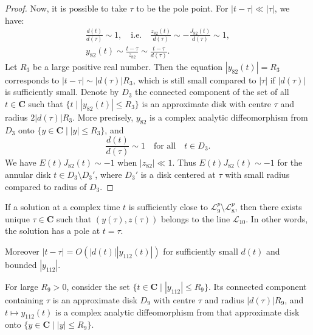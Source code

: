 \begin{proof}
 Now, it is possible to take $\tau$ to be the pole point.
 For $|t-\tau|\ll|\tau|$, we have:
 \begin{gather*}
 \frac{d(t)}{d(\tau)}\sim1,
 \quad\text{i.e.}\quad
 \frac{z_{82}(t)}{d(\tau)}\sim-\frac{J_{82}(t)}{d(\tau)}\sim1,
 \\
 y_{82}(t)\sim\frac{t-\tau}{z_{82}}\sim\frac{t-\tau}{d(\tau)}.
 \end{gather*}
 Let $R_3$ be a large positive real number.
 Then the equation $|y_{82}(t)|=R_3$ corresponds to $|t-\tau|\sim|d(\tau)|R_3$, which is still small compared to $|\tau|$ if $|d(\tau)|$ is sufficiently small.
 Denote by $D_3$ the connected component of the set of all $t\in\mathbf{C}$ such that $\{t\mid |y_{82}(t)|\le R_3\}$ is an approximate disk with centre $\tau$ and radius $2|d(\tau)|R_3$.
More precisely, $y_{82}$ is a complex analytic diffeomorphism from $D_3$ onto $\{y\in\mathbf{C}\mid|y|\le R_3\}$, and
$$
\frac{d(t)}{d(\tau)}\sim1
\quad\text{for all}\quad
t\in D_3.
$$
We have $E(t)J_{82}(t)\sim-1$ when $|z_{82}|\ll1$.
Thus $E(t)J_{82}(t)\sim-1$ for the annular disk $t\in D_3\setminus D_3'$, where $D_3'$ is a disk centered at $\tau$ with small radius compared to radius of $D_3$.
\end{proof}

\begin{lemma}\label{lemma:L9}
 If a solution at a complex time $t$ is sufficiently close to  $\mathcal{L}_9^p\setminus\mathcal{L}_8^p$, then there exists unique $\tau\in\mathbf{C}$ such that $(y(\tau),z(\tau))$ belongs to the line $\mathcal{L}_{10}$.
  In other words, the solution has a pole at $t=\tau$.
  
Moreover
$|t-\tau|=O(|d(t)||y_{112}(t)|)$
 for sufficiently small $d(t)$ and bounded $|y_{112}|$.
 
 For large $R_9>0$, consider the set $\{ t\in\mathbf{C} \mid |y_{112}|\le R_9\}$.
 Its connected component containing $\tau$ is an approximate disk $D_9$ with centre $\tau$ and radius $|d(\tau)|R_9$,
 and $t\mapsto y_{112}(t)$ is a complex analytic diffeomorphism from that approximate disk onto $\{y\in\mathbf{C}\mid|y|\le R_9\}$.
 \end{lemma}
 
